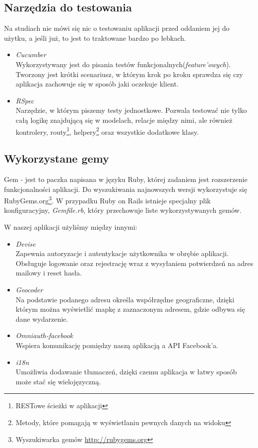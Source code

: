   \subsection{Narzędzia do testowania}
    Na studiach nie mówi się nic o testowaniu aplikacji przed oddaniem jej do użytku, a jeśli już, to jest to traktowane bardzo po łebkach.


    \begin{itemize}
      \item \emph{Cucumber} \\ Wykorzystywany jest do pisania testów funkcjonalnych(\emph{feature'owych}). Tworzony jest krótki scenariusz, w którym krok po kroku sprawdza się czy aplikacja zachowuje się w sposób jaki oczekuje klient.
      \item \emph{RSpec} \\ Narzędzie, w którym piszemy testy jednostkowe. Pozwala testować nie tylko całą logikę znajdującą się w modelach, relacje między nimi, ale również kontrolery, routy\footnote{RESTowe ścieżki w aplikacji}, helpery\footnote{Metody, które pomagają w wyświetlaniu pewnych danych na widoku} oraz wszystkie dodatkowe klasy.
    \end{itemize}

  \subsection{Wykorzystane gemy}
    Gem - jest to paczka napisana w języku Ruby, której zadaniem jest rozszerzenie funkcjonalności aplikacji. Do wyszukiwania najnowszych wersji wykorzystuje się RubyGems.org\footnote{Wyszukiwarka gemów \url{http://rubygems.org}}. W przypadku Ruby on Rails istnieje specjalny plik konfiguracyjny, \emph{Gemfile.rb}, który przechowuje liste wykorzystywanych gemów.

    W naszej aplikacji użyliśmy między innymi:
    \begin{itemize}
      \item \emph{Devise} \\ Zapewnia autoryzacje i autentykacje użytkownika w obrębie aplikacji. Obsługuje logowanie oraz rejestrację wraz z wysyłaniem potwierdzeń na adres mailowy i reset hasła.
      \item \emph{Geocoder} \\ Na podstawie podanego adresu określa współrzędne geograficzne, dzięki którym można wyświetlić mapkę z zaznaczonym adresem, gdzie odbywa się dane wydarzenie.
      \item \emph{Omniauth-facebook} \\ Wspiera komunikację pomiędzy naszą aplikacją a API Facebook'a.
      \item \emph{i18n} \\ Umożliwia dodawanie tłumaczeń, dzięki czemu aplikacja w łatwy sposób może stać się wielojęzyczną.
    \end{itemize}
